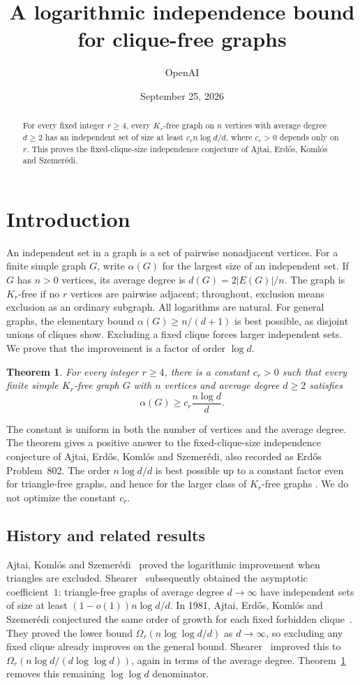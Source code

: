 \documentclass[11pt]{article}
\title{A logarithmic independence bound for clique-free graphs}
\author{OpenAI}
\date{September 25, 2026}
\newtheorem{theorem}{Theorem}[section]
\theoremstyle{definition}
\theoremstyle{remark}
\numberwithin{equation}{section}
\begin{document}
\begin{abstract}
For every fixed integer $r\ge4$, every $K_r$-free graph on $n$ vertices
with average degree $d\ge2$ has an independent set of size at least
$c_r n\log d/d$, where $c_r>0$ depends only on $r$.
This proves the fixed-clique-size independence conjecture of Ajtai,
Erd\H{o}s, Koml\'os and Szemer\'edi.
\end{abstract}
\setcounter{tocdepth}{1}
\tableofcontents
 
\section{Introduction}
\label{sec:introduction}

An independent set in a graph is a set of pairwise nonadjacent vertices.
For a finite simple graph $G$, write $\alpha(G)$ for the largest size of
an independent set. If $G$ has $n>0$ vertices, its average degree is
$d(G)=2|E(G)|/n$. The graph is $K_r$-free if no $r$ vertices are pairwise
adjacent; throughout, exclusion means exclusion as an ordinary subgraph.
All logarithms are natural. For general graphs, the elementary bound
$\alpha(G)\ge n/(d+1)$ is best possible, as disjoint unions of cliques
show. Excluding a fixed clique forces larger independent sets. We prove
that the improvement is a factor of order $\log d$.

\begin{theorem}\label{thm:main}
For every integer $r\ge4$, there is a constant $c_r>0$ such that every
finite simple $K_r$-free graph $G$ with $n$ vertices and average degree $d\ge2$
satisfies
\[
 \alpha(G)\ge c_r\frac{n\log d}{d}.
\]
\end{theorem}

The constant is uniform in both the number of vertices and the average
degree. The theorem gives a positive answer to the fixed-clique-size
independence conjecture of Ajtai, Erd\H{o}s, Koml\'os and Szemer\'edi,
also recorded as Erd\H{o}s Problem~802. The order $n\log d/d$ is best
possible up to a constant factor even for triangle-free graphs, and
hence for the larger class of $K_r$-free graphs
\cite[pp.~314--315]{AEKS1981}. We do not optimize the constant $c_r$.

\subsection{History and related results}

Ajtai, Koml\'os and Szemer\'edi~\cite{AKS1980} proved the logarithmic
improvement when triangles are excluded.
Shearer~\cite{Shearer1983} subsequently obtained the asymptotic
coefficient~$1$: triangle-free graphs of average degree $d\to\infty$
have independent sets of size at least $(1-o(1))n\log d/d$.
In 1981, Ajtai, Erd\H os, Koml\'os and Szemer\'edi conjectured the same
order of growth for each fixed forbidden clique~\cite[p.~314, Equation~(3)]{AEKS1981}.
They proved the lower bound $\Omega_r(n\log\log d/d)$ as $d\to\infty$,
so excluding any fixed clique already improves on the general bound.
Shearer~\cite[Corollary~2]{Shearer1995} improved this to
$\Omega_r(n\log d/(d\log\log d))$, again in terms of the average
degree. Theorem~\ref{thm:main} removes this remaining $\log\log d$
denominator.
\end{document}
